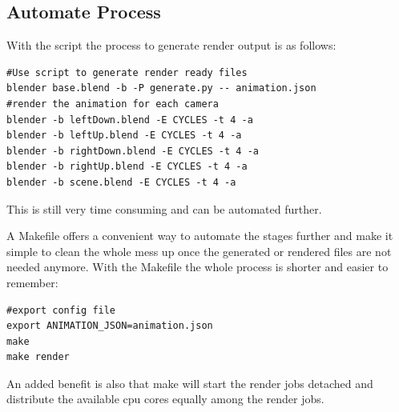 \subsection{Automate Process}
With the script the process to generate render output is as follows:
\textbf{}
\begin{lstlisting}
#Use script to generate render ready files
blender base.blend -b -P generate.py -- animation.json
#render the animation for each camera
blender -b leftDown.blend -E CYCLES -t 4 -a
blender -b leftUp.blend -E CYCLES -t 4 -a
blender -b rightDown.blend -E CYCLES -t 4 -a
blender -b rightUp.blend -E CYCLES -t 4 -a
blender -b scene.blend -E CYCLES -t 4 -a
\end{lstlisting}

This is still very time consuming and can be automated further. 

A Makefile offers a convenient way to automate the stages further and make it simple to clean the whole mess up once the generated or rendered files are not needed anymore. 
With the Makefile the whole process is shorter and easier to remember:
\textbf{}
\begin{lstlisting}
#export config file
export ANIMATION_JSON=animation.json
make
make render
\end{lstlisting}

An added benefit is also that make will start the render jobs detached and distribute the available cpu cores equally among the render jobs.